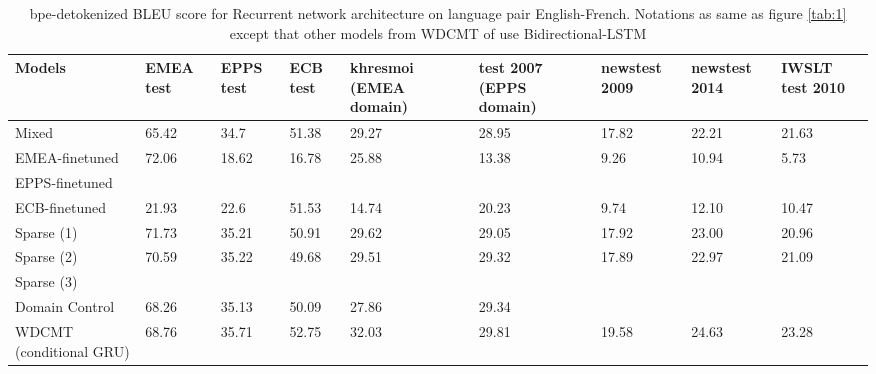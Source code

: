 \documentclass[11pt,a4paper]{article}
\begin{document}
\begin{table}
\begin{center}
 \begin{tabularx}{\textwidth}{|| X | X | X | X | X | X | X | X | X ||} 
 \hline
 Models & EMEA test & EPPS test & ECB test & khresmoi (EMEA domain) & test 2007 (EPPS domain) & newstest 2009 & newstest 2014 & IWSLT test 2010 \\ [0.5ex] 
 \hline\hline
 Mixed & 65.42 & 34.7 & 51.38 & 29.27 & 28.95 & 17.82 & 22.21 & 21.63 \\
 \hline
 EMEA-finetuned  & 72.06 & 18.62 & 16.78 & 25.88 & 13.38 & 9.26 & 10.94 & 5.73 \\
 \hline
 EPPS-finetuned & & & & & & & & \\
 \hline
 ECB-finetuned & 21.93 & 22.6 & 51.53 & 14.74 & 20.23 & 9.74 & 12.10 & 10.47 \\
 \hline
 Sparse (1) & 71.73 & 35.21 & 50.91 & 29.62 & 29.05 & 17.92 & 23.00 & 20.96 \\
 \hline
 Sparse (2) & 70.59 & 35.22 & 49.68 & 29.51 & 29.32 & 17.89 & 22.97 & 21.09 \\
 \hline
 Sparse (3) &  &  &  &  &  &  &  & \\
 \hline
 Domain Control & 68.26 & 35.13 & 50.09 & 27.86 & 29.34 & & & \\
 \hline
 WDCMT (conditional GRU) & 68.76 & 35.71 & 52.75 & 32.03 & 29.81 & 19.58 & 24.63 & 23.28 \\
 \hline 
\end{tabularx}
\end{center}
\caption{bpe-detokenized BLEU score for Recurrent network architecture on language pair English-French. Notations as same as figure \ref{tab:1} except that other models from WDCMT of \cite{Zeng18multidomain} use Bidirectional-LSTM}
\label{tab:3}
\end{table}
\end{document}
